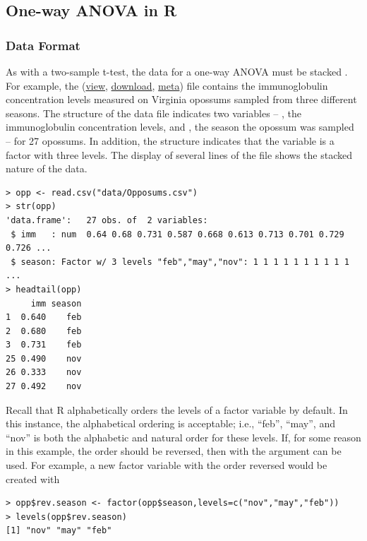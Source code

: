 \documentclass[10pt,openany]{book}\usepackage[]{graphicx}\usepackage[]{color}
\makeatletter
\newenvironment{kframe}{%
 \def\at@end@of@kframe{}%
 \ifinner\ifhmode%
  \def\at@end@of@kframe{\end{minipage}}%
  \begin{minipage}{\columnwidth}%
 \fi\fi%
 \def\FrameCommand##1{\hskip\@totalleftmargin \hskip-\fboxsep
 \colorbox{shadecolor}{##1}\hskip-\fboxsep
     \hskip-\linewidth \hskip-\@totalleftmargin \hskip\columnwidth}%
 \MakeFramed {\advance\hsize-\width
   \@totalleftmargin\z@ \linewidth\hsize
   \@setminipage}}%
 {\par\unskip\endMakeFramed%
 \at@end@of@kframe}
\newenvironment{knitrout}{}{} %
\makeatother
\begin{document}
\subsection{One-way ANOVA in R}
\subsubsection*{Data Format}
As with a two-sample t-test, the data for a one-way ANOVA must be stacked .  For example, the  (\href{https://github.com/droglenc/NCData/blob/master/Opposums.csv}{view}, \href{https://raw.githubusercontent.com/droglenc/NCData/master/Opposums.csv}{download}, \href{https://github.com/droglenc/NCData/blob/master/Opposums_meta.txt}{meta}) file contains the immunoglobulin concentration levels measured on Virginia opossums sampled from three different seasons.  The structure of the data file indicates two variables -- , the immunoglobulin concentration levels, and , the season the opossum was sampled -- for 27 opossums.  In addition, the  structure indicates that the  variable is a factor with three levels.  The display of several lines of the file shows the stacked nature of the data.

\begin{knitrout}
\color{fgcolor}\begin{kframe}
\begin{verbatim}
> opp <- read.csv("data/Opposums.csv")
> str(opp)
'data.frame':	27 obs. of  2 variables:
 $ imm   : num  0.64 0.68 0.731 0.587 0.668 0.613 0.713 0.701 0.729 0.726 ...
 $ season: Factor w/ 3 levels "feb","may","nov": 1 1 1 1 1 1 1 1 1 1 ...
> headtail(opp)
     imm season
1  0.640    feb
2  0.680    feb
3  0.731    feb
25 0.490    nov
26 0.333    nov
27 0.492    nov
\end{verbatim}
\end{kframe}
\end{knitrout}

Recall that R alphabetically orders the levels of a factor variable by default.  In this instance, the alphabetical ordering is acceptable; i.e., ``feb'', ``may'', and ``nov'' is both the alphabetic and natural order for these levels.  If, for some reason in this example, the order should be reversed, then  with the  argument can be used.  For example, a new factor variable with the order reversed would be created with

\begin{knitrout}
\color{fgcolor}\begin{kframe}
\begin{verbatim}
> opp$rev.season <- factor(opp$season,levels=c("nov","may","feb"))
> levels(opp$rev.season)
[1] "nov" "may" "feb"
\end{verbatim}
\end{kframe}
\end{knitrout}
\end{document}
